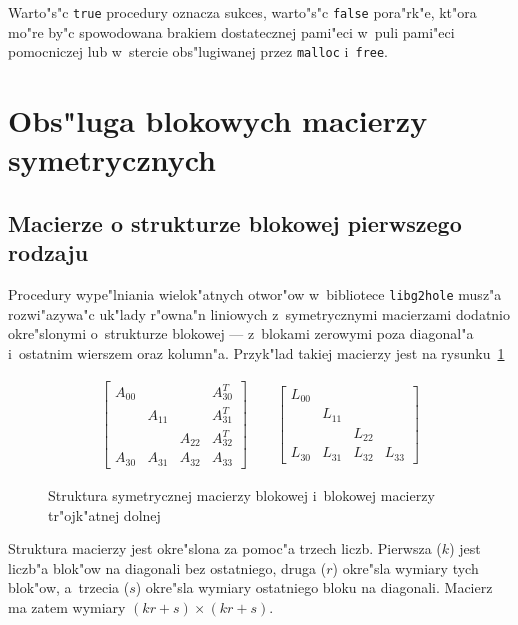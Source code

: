 Warto"s"c \texttt{true} procedury oznacza sukces, warto"s"c \texttt{false}
pora"rk"e, kt"ora mo"re by"c spowodowana brakiem dostatecznej
pami"eci w~puli pami"eci pomocniczej lub w~stercie obs"lugiwanej
przez \texttt{malloc} i~\texttt{free}.


\newpage
\section{\label{sect:block:sym:array}Obs"luga blokowych macierzy symetrycznych}

\subsection{Macierze o strukturze blokowej pierwszego rodzaju}

\begin{sloppypar}
Procedury wype"lniania wielok"atnych otwor"ow w~bibliotece \texttt{libg2hole}
musz"a roz\-wi"a\-zywa"c uk"lady r"owna"n liniowych z~symetrycznymi
macierzami dodatnio okre"slonymi o~strukturze blokowej --- z~blokami zerowymi
poza diagonal"a i~ostatnim wierszem oraz kolumn"a. Przyk"lad takiej macierzy
jest na rysunku~\ref{fig:block:sympos}%
\end{sloppypar}
\begin{figure}[ht]
  \begin{align*}
    \left[\begin{array}{cccc}
      A_{00} & & & A_{30}^T \\
      & A_{11} & & A_{31}^T \\
      & & A_{22} & A_{32}^T \\
      A_{30} & A_{31} & A_{32} & A_{33} 
    \end{array}\right] \qquad
    \left[\begin{array}{cccc}
      L_{00} & & & \\
      & L_{11} & & \\
      & & L_{22} & \\
      L_{30} & L_{31} & L_{32} & L_{33} 
    \end{array}\right]
  \end{align*}
  \caption{\label{fig:block:sympos}Struktura symetrycznej macierzy blokowej i~blokowej macierzy tr"ojk"atnej dolnej}
\end{figure}

Struktura macierzy jest okre"slona za pomoc"a trzech liczb.
Pierwsza ($k$) jest liczb"a blok"ow na diagonali bez ostatniego,
druga ($r$) okre"sla wymiary tych blok"ow,
a~trzecia ($s$) okre"sla wymiary ostatniego bloku na diagonali.
Macierz ma zatem wymiary $(kr+s)\times(kr+s)$.

